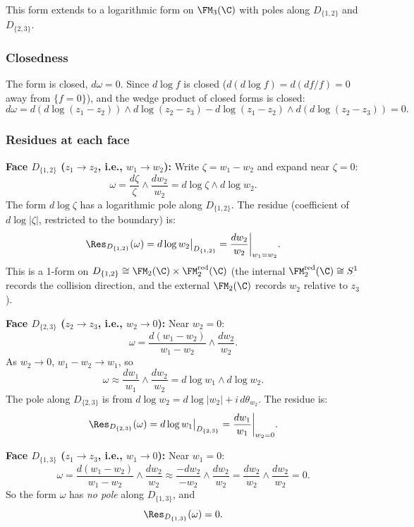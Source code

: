 This form extends to a logarithmic form on $\FM_3(\C)$ with poles along $D_{\{1,2\}}$ and $D_{\{2,3\}}$.

\subsubsection{Closedness}

The form is closed, $d\omega = 0$. Since $d\log f$ is closed ($d(d\log f) = d(df/f) = 0$ away from $\{f=0\}$), and the wedge product of closed forms is closed:
\[
d\omega = d(d\log(z_1-z_2))\wedge d\log(z_2-z_3) - d\log(z_1-z_2)\wedge d(d\log(z_2-z_3)) = 0.
\]

\subsubsection{Residues at each face}

\textbf{Face $D_{\{1,2\}}$ ($z_1\to z_2$, i.e., $w_1\to w_2$):}
Write $\zeta = w_1 - w_2$ and expand near $\zeta = 0$:
\[
\omega = \frac{d\zeta}{\zeta}\wedge\frac{dw_2}{w_2} = d\log\zeta\wedge d\log w_2.
\]
The form $d\log\zeta$ has a logarithmic pole along $D_{\{1,2\}}$. The residue (coefficient of $d\log|\zeta|$, restricted to the boundary) is:
\[
\Res_{D_{\{1,2\}}}(\omega) = d\log w_2\big|_{D_{\{1,2\}}} = \frac{dw_2}{w_2}\bigg|_{w_1=w_2}.
\]
This is a 1-form on $D_{\{1,2\}} \cong \FM_2(\C)\times\FM_2^{\mathrm{red}}(\C)$ (the internal $\FM_2^{\mathrm{red}}(\C) \cong S^1$ records the collision direction, and the external $\FM_2(\C)$ records $w_2$ relative to $z_3$).

\textbf{Face $D_{\{2,3\}}$ ($z_2\to z_3$, i.e., $w_2\to 0$):}
Near $w_2 = 0$:
\[
\omega = \frac{d(w_1-w_2)}{w_1-w_2}\wedge\frac{dw_2}{w_2}.
\]
As $w_2\to 0$, $w_1 - w_2 \to w_1$, so
\[
\omega \approx \frac{dw_1}{w_1}\wedge\frac{dw_2}{w_2} = d\log w_1\wedge d\log w_2.
\]
The pole along $D_{\{2,3\}}$ is from $d\log w_2 = d\log|w_2| + i\,d\theta_{w_2}$. The residue is:
\[
\Res_{D_{\{2,3\}}}(\omega) = d\log w_1\big|_{D_{\{2,3\}}} = \frac{dw_1}{w_1}\bigg|_{w_2=0}.
\]

\textbf{Face $D_{\{1,3\}}$ ($z_1\to z_3$, i.e., $w_1\to 0$):}
Near $w_1 = 0$:
\[
\omega = \frac{d(w_1-w_2)}{w_1-w_2}\wedge\frac{dw_2}{w_2} \approx \frac{-dw_2}{-w_2}\wedge\frac{dw_2}{w_2} = \frac{dw_2}{w_2}\wedge\frac{dw_2}{w_2} = 0.
\]
So the form $\omega$ has \emph{no pole} along $D_{\{1,3\}}$, and
\[
\Res_{D_{\{1,3\}}}(\omega) = 0.
\]

